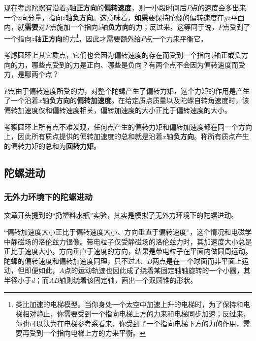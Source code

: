 现在考虑陀螺有沿着$y$轴\textbf{正方向}的\textbf{偏转速度}，则一小段时间后$P$点的速度会多出来一个$z$向分量，指向$z$轴\textbf{负方向}。这意味着，\textbf{如果}要保持陀螺的偏转速度在$yz$平面内，就\textbf{需要}对$P$点施加一个指向$z$轴\textbf{负方向}的力；反过来，这等同于说，$P$点受到了一个指向$z$轴\textbf{正方向}的力\footnote{类比加速的电梯模型。当你身处一个太空中加速上升的电梯时，为了保持和电梯相对静止，你需要受到一个指向电梯上方的力来和电梯同步加速；反过来，你也可以认为在电梯参考系看来，你受到了一个指向电梯下方的力的作用，需要再受到一个指向电梯上方的力来平衡。}，因此才需要额外给$P$点一个力来平衡它。

\begin{exercise}{}
考虑圆环上其它质点，它们也会因为偏转速度的存在而受到一个指向$z$轴正或负方向的力，哪些点受到的力是正向、哪些是负向？有两个点不会因为偏转速度而受力，是哪两个点？
\end{exercise}


$P$点由于偏转速度所受的力，对整个陀螺产生了偏转力矩，这个力矩的作用是产生了一个沿着$x$轴\textbf{负方向}的\textbf{偏转加速度}。在给定质点质量以及陀螺自转角速度时，该偏转加速度仅和偏转速度相关，偏转加速度的大小正比于偏转速度的大小。

考察圆环上所有点不难发现，任何点产生的偏转力矩和偏转加速度都在同一个方向上，因此所有质点提供的偏转加速度的总和就是沿着$x$轴\textbf{负方向}。称所有质点产生的偏转力矩的总和为\textbf{回转力矩}。










\subsection{陀螺进动}


\subsubsection{无外力环境下的陀螺进动}


文章开头提到的“扔塑料水瓶”实验，其实是模拟了无外力环境下的陀螺进动。


“偏转加速度大小正比于偏转速度大小、方向垂直于偏转速度”，这个情况和电磁学中静磁场的洛伦兹力很像。带电粒子仅受静磁场的洛伦兹力时，其加速度大小总是正比于速度大小，方向垂直于速度的方向，结果是带电粒子在平面内做圆周运动。陀螺的偏转速度和偏转加速度同理，只不过$A$、$B$两点是在一个球面而非平面上运动，但即便如此，$A$点的运动轨迹也因此成了绕着某固定轴轴旋转的一个小圆，其半径小于$d$；而$AB$轴则绕着该固定轴，画出一个双圆锥的形状。



